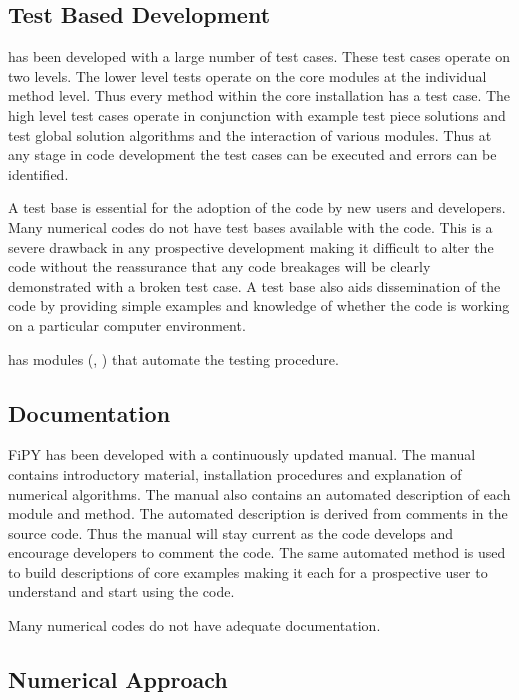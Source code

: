 \subsection{Test Based Development}

\FiPy{} has been developed with a large number of test cases. These test
cases operate on two levels. The lower level tests operate on the core
modules at the individual method level. Thus every method within the
core installation has a test case. The high level test cases operate
in conjunction with example test piece solutions and test global
solution algorithms and the interaction of various modules. Thus at
any stage in code development the test cases can be executed and
errors can be identified.

A test base is essential for the adoption of the code by new users and
developers. Many numerical codes do not have test bases available with
the code. This is a severe drawback in any prospective development
making it difficult to alter the code without the reassurance that any
code breakages will be clearly demonstrated with a broken test case. A
test base also aids dissemination of the code by providing simple
examples and knowledge of whether the code is working on a particular
computer environment.

\Python{} has modules (\doctest{}, \unittest{}) that automate the testing procedure.

\subsection{Documentation}

FiPY has been developed with a continuously updated manual. The manual
contains introductory material, installation procedures and
explanation of numerical algorithms. The manual also contains an
automated description of each module and method. The automated
description is derived from comments in the source code. Thus the
manual will stay current as the code develops and encourage developers
to comment the code. The same automated method is used to build
descriptions of core examples making it each for a prospective user to
understand and start using the code.

Many numerical codes do not have adequate documentation.

\subsection{Numerical Approach}


